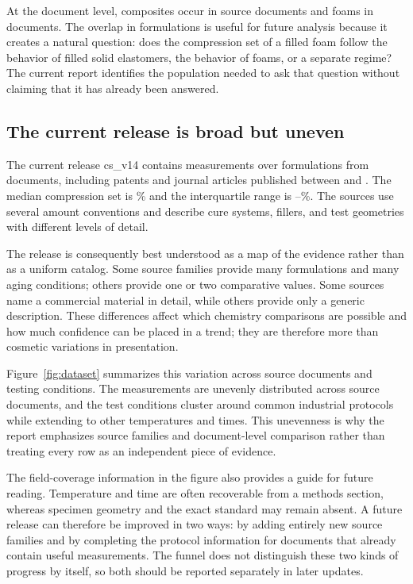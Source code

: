 \documentclass[10pt]{article}
\newcommand{\release}{cs\_v14}
\begin{document}
At the document level, composites occur in \nCompositeDocs{} source documents
and foams in \nFoamDocs{} documents. The overlap in formulations is useful for
future analysis because it creates a natural question: does the compression
set of a filled foam follow the behavior of filled solid elastomers, the
behavior of foams, or a separate regime? The current report identifies the
population needed to ask that question without claiming that it has already
been answered.

\subsection{The current release is broad but uneven}
The current release \release{} contains \nRelRows{} measurements over
\nRelForms{} formulations from \nRelDocs{} documents, including \nRelPatents{}
patents and \nRelJournals{} journal articles published between \nRelYearMin{}
and \nRelYearMax{}. The median compression set is \nRelMedian\% and the
interquartile range is \nRelIQRlo--\nRelIQRhi\%. The sources use several
amount conventions and describe cure systems, fillers, and test geometries
with different levels of detail.

The release is consequently best understood as a map of the evidence rather
than as a uniform catalog. Some source families provide many formulations and
many aging conditions; others provide one or two comparative values. Some
sources name a commercial material in detail, while others provide only a
generic description. These differences affect which chemistry comparisons are
possible and how much confidence can be placed in a trend; they are therefore
more than cosmetic variations in presentation.

Figure~\ref{fig:dataset} summarizes this variation across source documents and
testing conditions. The measurements are
unevenly distributed across source documents, and the test conditions cluster
around common industrial protocols while extending to other temperatures and
times. This unevenness is why the report emphasizes source families and
document-level comparison rather than treating every row as an independent
piece of evidence.

The field-coverage information in the figure also provides a guide for future
reading. Temperature and time are often recoverable from a methods section,
whereas specimen geometry and the exact standard may remain absent. A future
release can therefore be improved in two ways: by adding entirely new source
families and by completing the protocol information for documents that already
contain useful measurements. The funnel does not distinguish these two kinds
of progress by itself, so both should be reported separately in later updates.
\end{document}
